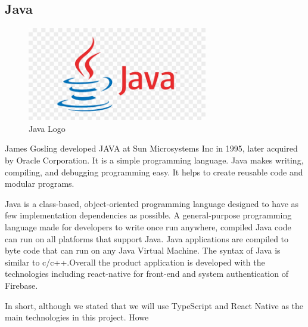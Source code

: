 \subsection{Java}

\begin{figure}[H]
	\centering
	\includegraphics[width=0.7\textwidth]{img/technology/java.png}
	\caption{Java Logo}
	\label{fig:JavaLogo}
\end{figure}

James Gosling developed JAVA at Sun Microsystems Inc in 1995, later acquired by Oracle Corporation. It is a simple programming language. Java makes writing, compiling, and debugging programming easy. It helps to create reusable code and modular programs.

Java is a class-based, object-oriented programming language designed to have as few implementation dependencies as possible. A general-purpose programming language made for developers to write once run anywhere, compiled Java code can run on all platforms that support Java. Java applications are compiled to byte code that can run on any Java Virtual Machine. The syntax of Java is similar to c/c++.Overall the product application is developed with the technologies including react-native for front-end and system authentication of Firebase.

In short, although we stated that we will use TypeScript and React Native as the main technologies in this project. Howe
